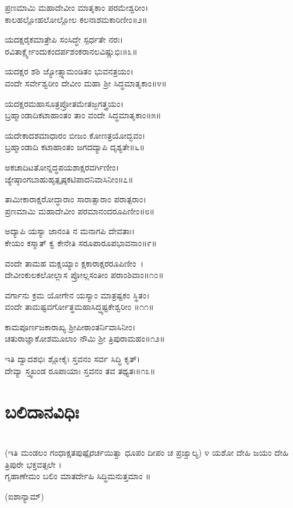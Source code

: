 ಪ್ರಣಮಾಮಿ ಮಹಾದೇವೀಂ ಮಾತೃಕಾಂ ಪರಮೇಶ್ವರೀಂ।\\
ಕಾಲಹಲ್ಲೋಹಲೋಲ್ಲೋಲ ಕಲನಾಶಮಕಾರಿಣೀಂ॥೨॥

ಯದಕ್ಷರೈಕಮಾತ್ರೇಪಿ ಸಂಸಿದ್ಧೇ ಸ್ಪರ್ಧತೇ ನರಃ।\\
ರವಿತಾರ್ಕ್ಷ್ಯೇಂದುಕಂದರ್ಪಶಂಕರಾನಲವಿಷ್ಣುಭಿಃ॥೩॥

ಯದಕ್ಷರ ಶಶಿ ಜ್ಯೋತ್ಸ್ನಾಮಂಡಿತಂ ಭುವನತ್ರಯಂ।\\
ವಂದೇ ಸರ್ವೇಶ್ವರೀಂ ದೇವೀಂ ಮಹಾ ಶ್ರೀ ಸಿದ್ಧಮಾತೃಕಾಂ॥೪॥

ಯದಕ್ಷರಮಹಾಸೂತ್ರಪ್ರೋತಮೇತಜ್ಜಗತ್ತ್ರಯಂ।\\
ಬ್ರಹ್ಮಾಂಡಾದಿಕಟಾಹಾಂತಂ ತಾಂ ವಂದೇ ಸಿದ್ಧಮಾತೃಕಾಂ॥೫॥

ಯದೇಕಾದಶಮಾಧಾರಂ ಬೀಜಂ ಕೋಣತ್ರಯೋದ್ಭವಂ।\\
ಬ್ರಹ್ಮಾಂಡಾದಿ ಕಟಾಹಾಂತಂ ಜಗದದ್ಯಾಪಿ ದೃಶ್ಯತೇ॥೬॥

ಅಕಚಾದಿಟತೋನ್ನದ್ಧಪಯಶಾಕ್ಷರವರ್ಗಿಣೀಂ।\\
ಜ್ಯೇಷ್ಠಾಂಗಬಾಹುಹೃತ್ಪೃಷ್ಠಕಟಿಪಾದನಿವಾಸಿನೀಂ॥೭॥

ತಾಮೀಕಾರಾಕ್ಷರೋದ್ಧಾರಾಂ ಸಾರಾತ್ಸಾರಾಂ ಪರಾತ್ಪರಾಂ।\\
ಪ್ರಣಮಾಮಿ ಮಹಾದೇವೀಂ ಪರಮಾನಂದರೂಪಿಣೀಂ॥೮॥

ಅದ್ಯಾಪಿ ಯಸ್ಯಾ ಜಾನಂತಿ ನ ಮನಾಗಪಿ ದೇವತಾಃ।\\
ಕೇಯಂ ಕಸ್ಮಾತ್ ಕ್ವ ಕೇನೇತಿ ಸರೂಪಾರೂಪಭಾವನಾಂ॥೯॥

ವಂದೇ ತಾಮಹ ಮಕ್ಷಯ್ಯಾಂ ಕ್ಷಕಾರಾಕ್ಷರರೂಪಿಣೀಂ~।\\
ದೇವೀಂಕುಲಕಲೋಲ್ಲಾಸ ಪ್ರೋಲ್ಲಸಂತೀಂ ಪರಾಂಶಿವಾಂ॥೧೦॥

ವರ್ಗಾನು ಕ್ರಮ ಯೋಗೇನ ಯಸ್ಯಾಂ ಮಾತ್ರಷ್ಟಕಂ ಸ್ಥಿತಂ।\\
ವಂದೇ ತಾಮಷ್ಟವರ್ಗೋತ್ಥಮಹಾಸಿದ್ಧ್ಯಷ್ಟಕೇಶ್ವರೀಂ ॥೧೧॥

ಕಾಮಪೂರ್ಣಜಕಾರಾಖ್ಯ ಶ್ರೀಪೀಠಾಂತರ್ನಿವಾಸಿನೀಂ।\\
ಚತುರಾಜ್ಞಾಕೋಶಮೂಲಾಂ ನೌಮಿ ಶ್ರೀ ತ್ರಿಪುರಾಮಹಂ॥೧೨॥

ಇತಿ ದ್ವಾದಶಭಿಃ ಶ್ಲೋಕೈಃ ಸ್ತವನಂ ಸರ್ವ ಸಿದ್ಧಿ ಕೃತ್।\\
ದೇವ್ಯಾ ಸ್ತ್ವಖಂಡ ರೂಪಾಯಾಃ ಸ್ತವನಂ ತವ ತಥ್ಯತಃ॥೧೩॥
\section{ಬಲಿದಾನವಿಧಿಃ}
\\ (ಇತಿ ಮಂಡಲಂ ಗಂಧಾಕ್ಷತಪುಷ್ಪೈರರ್ಚಯಿತ್ವಾ ಧೂಪಂ ದೀಪಂ ಚ ಪ್ರಜ್ವಾಲ್ಯ)
\newpage
೪ ಯಶೋ ದೇಹಿ ಜಯಂ ದೇಹಿ ತ್ರಿಪುರೇ ಭಕ್ತವತ್ಸಲೇ ।\\ ಗೃಹಾಣೇಮಂ ಬಲಿಂ ಮಾತರ್ದೇಹಿ ಸಿದ್ಧಿಮನುತ್ತಮಾಂ ॥

(ಐಶಾನ್ಯಾಮ್)\\

